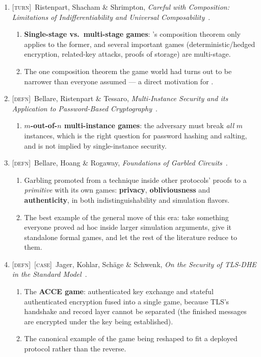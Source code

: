 \documentclass[11pt]{article}
\newcommand{\kind}[1]{{\footnotesize\textsc{\textcolor{yearcolor}{[#1]}}}\ }
\newcommand{\defn}{\kind{defn}}
\newcommand{\turn}{\kind{turn}}
\newcommand{\case}{\kind{case}}
\newcommand{\paper}[3]{#1, \emph{#2}~\cite{#3}.}
\begin{document}
\begin{enumerate}
  \item \turn \paper{Ristenpart, Shacham \& Shrimpton}{Careful with Composition:
    Limitations of Indifferentiability and Universal Composability}{RSS11}
    \begin{enumerate}
      \item \textbf{Single-stage vs.\ multi-stage games}: \cite{MRH04}'s
        composition theorem only applies to the former, and several important
        games (deterministic/hedged encryption, related-key attacks, proofs of
        storage) are multi-stage.
      \item The one composition theorem the game world had turns out to be
        narrower than everyone assumed --- a direct motivation for
        \cite{SSP18}.
    \end{enumerate}

  \item \defn \paper{Bellare, Ristenpart \& Tessaro}{Multi-Instance Security and
    its Application to Password-Based Cryptography}{BRT12}
    \begin{enumerate}
      \item \textbf{$m$-out-of-$n$ multi-instance games}: the adversary must
        break \emph{all} $m$ instances, which is the right question for password
        hashing and salting, and is not implied by single-instance security.
    \end{enumerate}

  \item \defn \paper{Bellare, Hoang \& Rogaway}{Foundations of Garbled Circuits}
    {BHR12}
    \begin{enumerate}
      \item Garbling promoted from a technique inside other protocols' proofs to
        a \emph{primitive} with its own games: \textbf{privacy},
        \textbf{obliviousness} and \textbf{authenticity}, in both
        indistinguishability and simulation flavors.
      \item The best example of the general move of this era: take something
        everyone proved ad hoc inside larger simulation arguments, give it
        standalone formal games, and let the rest of the literature reduce to
        them.
    \end{enumerate}

  \item \defn\case \paper{Jager, Kohlar, Schäge \& Schwenk}{On the Security of
    TLS-DHE in the Standard Model}{JKSS12}
    \begin{enumerate}
      \item The \textbf{ACCE game}: authenticated key exchange and stateful
        authenticated encryption fused into a single game, because TLS's
        handshake and record layer cannot be separated (the finished messages
        are encrypted under the key being established).
      \item The canonical example of the game being reshaped to fit a deployed
        protocol rather than the reverse.
    \end{enumerate}
\end{enumerate}
\end{document}
